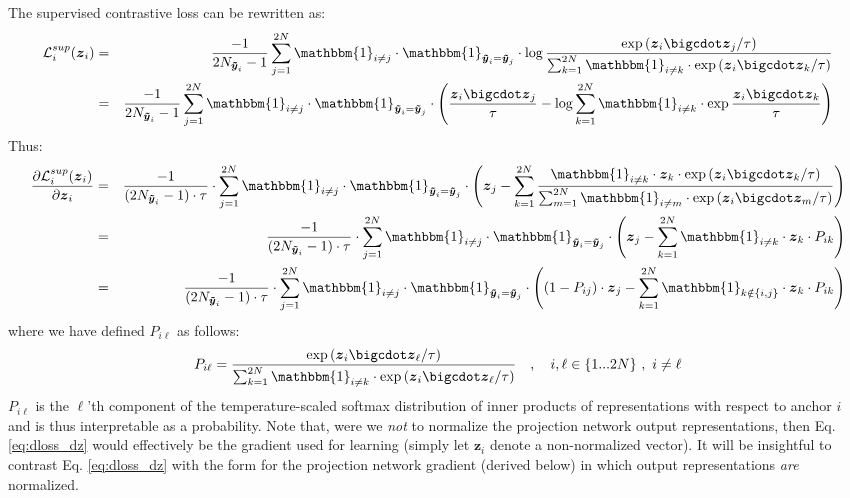 The supervised contrastive loss can be rewritten as:
\begin{eqnarray}
  \mathcal{L}_i^{sup}(\boldsymbol{z}_i) & = & \frac{-1}{2N_{\boldsymbol{\tilde{y}}_i}-1}\sum_{j=1}^{2N}\mathbbm{1}_{i\neq j}\cdot\mathbbm{1}_{\boldsymbol{\tilde{y}}_i=\boldsymbol{\tilde{y}}_j}\cdot\log{\frac{\exp{\left(\boldsymbol{z}_i\bigcdot\boldsymbol{z}_j/\tau\right)}}{\sum_{k=1}^{2N}\mathbbm{1}_{i\neq k}\cdot\exp{\left(\boldsymbol{z}_i\bigcdot\boldsymbol{z}_k/\tau\right)}}}\nonumber\\
  & = & \frac{-1}{2N_{\boldsymbol{\tilde{y}}_i}-1}
  \sum_{j=1}^{2N}\mathbbm{1}_{i\neq j}\cdot\mathbbm{1}_{\boldsymbol{\tilde{y}}_i=\boldsymbol{\tilde{y}}_j}\cdot\left(\frac{\boldsymbol{z}_i\bigcdot\boldsymbol{z}_j}{\tau}-\log{\sum_{k=1}^{2N}\mathbbm{1}_{i\neq k}\cdot\exp{\frac{\boldsymbol{z}_i\bigcdot\boldsymbol{z}_k}{\tau}}}\right)\nonumber
\end{eqnarray}
Thus:
\begin{eqnarray}
  \frac{\partial\mathcal{L}_i^{sup}(\boldsymbol{z}_i)}{\partial\boldsymbol{z}_i} & = & \frac{-1}{(2N_{\boldsymbol{\tilde{y}}_i}-1)\cdot\tau}\cdot\sum_{j=1}^{2N}\mathbbm{1}_{i\neq j}\cdot\mathbbm{1}_{\boldsymbol{\tilde{y}}_i=\boldsymbol{\tilde{y}}_j}\cdot
  \left(
    \boldsymbol{z}_j
    -\sum_{k=1}^{2N}\frac{\mathbbm{1}_{i\neq k}\cdot\boldsymbol{z}_k\cdot\exp{(\boldsymbol{z}_i\bigcdot\boldsymbol{z}_k/\tau)}}{\sum_{m=1}^{2N}\mathbbm{1}_{i\neq m}\cdot\exp{(\boldsymbol{z}_i\bigcdot\boldsymbol{z}_m/\tau)}}
  \right) \nonumber \\
  & = & \frac{-1}{(2N_{\boldsymbol{\tilde{y}}_i}-1)\cdot\tau}\cdot\sum_{j=1}^{2N}\mathbbm{1}_{i\neq j}\cdot\mathbbm{1}_{\boldsymbol{\tilde{y}}_i=\boldsymbol{\tilde{y}}_j}\cdot
  \left(
    \boldsymbol{z}_j-\sum_{k=1}^{2N}\mathbbm{1}_{i\neq k}\cdot\boldsymbol{z}_k\cdot P_{ik}
  \right) \nonumber \\
  & = & \frac{-1}{(2N_{\boldsymbol{\tilde{y}}_i}-1)\cdot\tau}\cdot\sum_{j=1}^{2N}\mathbbm{1}_{i\neq j}\cdot\mathbbm{1}_{\boldsymbol{\tilde{y}}_i=\boldsymbol{\tilde{y}}_j}\cdot
  \left(
    (1-P_{ij})\cdot\boldsymbol{z}_j-\sum_{k=1}^{2N}\mathbbm{1}_{k\notin\{i,j\}}\cdot\boldsymbol{z}_k\cdot P_{ik}
  \right) \label{eq:dloss_dz}
\end{eqnarray}
where we have defined $P_{i\ell}$ as follows:
\begin{equation}
P_{i\ell}=\frac{\text{exp}\left(\boldsymbol{z}_i\bigcdot\boldsymbol{z}_\ell/\tau\right)}{\sum_{k=1}^{2N}\mathbbm{1}_{i\neq k}\cdot\text{exp}\left(\boldsymbol{z}_i\bigcdot\boldsymbol{z}_\ell/\tau\right)}\ \ \ ,\ \ \ i,\ell\in\{1...2N\}\ ,\ i\neq\ell \nonumber
\end{equation}
$P_{i\ell}$ is the $\ell$'th component of the temperature-scaled softmax distribution of inner products of representations with respect to anchor $i$ and is thus interpretable as a probability. Note that, were we \emph{not} to normalize the projection network output representations, then Eq. \ref{eq:dloss_dz} would effectively be the gradient used for learning (simply let $\boldsymbol{z}_i$ denote a non-normalized vector). It will be insightful to contrast Eq. \ref{eq:dloss_dz} with the form for the projection network gradient (derived below) in which output representations \emph{are} normalized.

